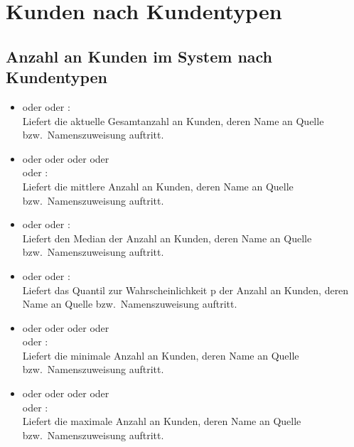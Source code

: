 \section{Kunden nach Kundentypen}



\subsection{Anzahl an Kunden im System nach Kundentypen}

\begin{itemize}

\item
{} oder  oder :\\
Liefert die aktuelle Gesamtanzahl an Kunden, deren Name an Quelle bzw.\ Namenszuweisung  auftritt.

\item
{} oder  oder  oder  oder\\
 oder :\\
Liefert die mittlere Anzahl an Kunden, deren Name an Quelle bzw.\ Namenszuweisung  auftritt.

\item
{} oder  oder :\\
Liefert den Median der Anzahl an Kunden, deren Name an Quelle bzw.\ Namenszuweisung  auftritt.

\item
{} oder  oder :\\
Liefert das Quantil zur Wahrscheinlichkeit p der Anzahl an Kunden, deren Name an Quelle bzw.\ Namenszuweisung  auftritt.

\item
{} oder  oder  oder  oder\\
 oder :\\
Liefert die minimale Anzahl an Kunden, deren Name an Quelle bzw.\ Namenszuweisung  auftritt.

\item
{} oder  oder  oder  oder\\
 oder :\\
Liefert die maximale Anzahl an Kunden, deren Name an Quelle bzw.\ Namenszuweisung  auftritt.


\end{itemize}
